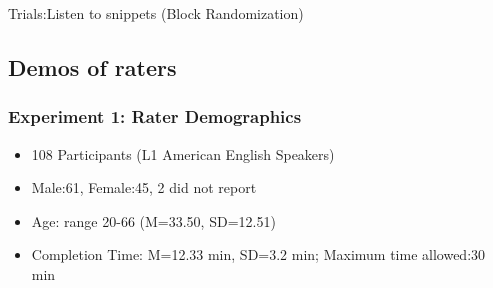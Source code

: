 \documentclass{beamer}
\begin{document}
\begin{frame}
{\begin{block}{Trials:Listen to snippets (Block Randomization)}
\begin{figure}
\end{figure}
\end{block}}
\end{frame}

\subsection{Demos of raters}
\begin{frame}
\frametitle{Experiment 1: Rater Demographics}
\begin{itemize}
\item 108 Participants (L1 American English Speakers)\linebreak
\item {Male:61, Female:45, 2 did not report}\linebreak
\item {Age: range 20-66 (M=33.50, SD=12.51)}\linebreak
\item {Completion Time: M=12.33 min, SD=3.2 min; \linebreak Maximum time allowed:30 min}
\end{itemize}
\end{frame}
\end{document}
